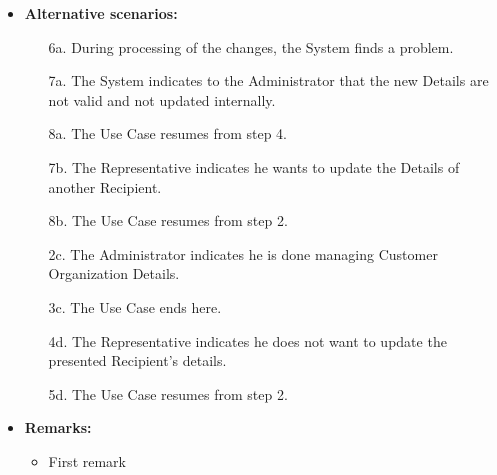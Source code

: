 \documentclass[a4paper,10pt]{article}
\begin{document}
\begin{itemize}
	\item \textbf{Alternative scenarios:} 
	\begin{enumerate}
		\item [6a.] During processing of the changes, the System finds a problem.
		\item [7a.] The System indicates to the Administrator that the new Details are not valid and not updated internally.
		\item [8a.] The Use Case resumes from step 4.
		\item [7b.] The Representative indicates he wants to update the Details of another Recipient.
		\item [8b.] The Use Case resumes from step 2.
		\item [2c.] The Administrator indicates he is done managing Customer Organization Details.
		\item [3c.] The Use Case ends here.
		\item [4d.] The Representative indicates he does not want to update the presented Recipient's details.
		\item [5d.] The Use Case resumes from step 2.
	\end{enumerate}
	
	\item \textbf{Remarks:}
	\begin{itemize}
		\item First remark
	\end{itemize}
\end{itemize}
\end{document}
